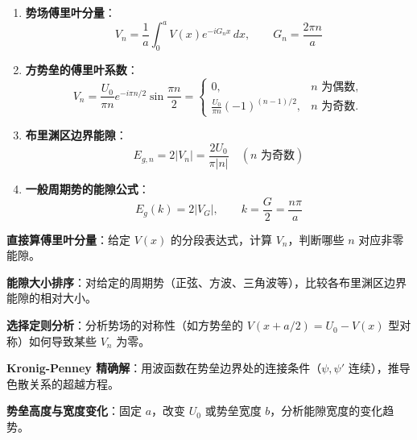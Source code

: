 \begin{formulabox}[核心公式]
\begin{enumerate}[label=\textbf{(\arabic*)}]
    \item \textbf{势场傅里叶分量}：
    \[
    V_n=\frac{1}{a}\int_0^a V(x)e^{-iG_n x}\,dx,\qquad G_n=\frac{2\pi n}{a}
    \]

    \item \textbf{方势垒的傅里叶系数}：
    \[
    V_n=\frac{U_0}{\pi n}e^{-i\pi n/2}\sin\frac{\pi n}{2}
    =\begin{cases}
    0, & n\text{ 为偶数},\\
    \displaystyle\frac{U_0}{\pi n}(-1)^{(n-1)/2}, & n\text{ 为奇数}.
    \end{cases}
    \]

    \item \textbf{布里渊区边界能隙}：
    \[
    E_{g,n}=2|V_n|=\frac{2U_0}{\pi|n|}\quad(n\text{ 为奇数})
    \]

    \item \textbf{一般周期势的能隙公式}：
    \[
    E_g(k)=2|V_{G}|,\qquad k=\frac{G}{2}=\frac{n\pi}{a}
    \]
\end{enumerate}
\end{formulabox}

\begin{drillbox}[训练点与考法变体]
 \textbf{直接算傅里叶分量}：给定 $V(x)$ 的分段表达式，计算 $V_n$，判断哪些 $n$ 对应非零能隙。

 \textbf{能隙大小排序}：对给定的周期势（正弦、方波、三角波等），比较各布里渊区边界能隙的相对大小。

 \textbf{选择定则分析}：分析势场的对称性（如方势垒的 $V(x+a/2)=U_0-V(x)$ 型对称）如何导致某些 $V_n$ 为零。

 \textbf{Kronig-Penney 精确解}：用波函数在势垒边界处的连接条件（$\psi, \psi'$ 连续），推导色散关系的超越方程。

 \textbf{势垒高度与宽度变化}：固定 $a$，改变 $U_0$ 或势垒宽度 $b$，分析能隙宽度的变化趋势。
\end{drillbox}

